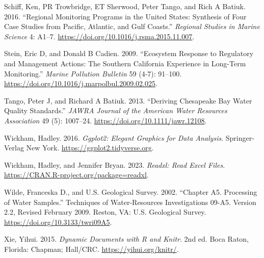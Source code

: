\begin{CSLReferences}{1}{0}
\leavevmode{}%
Schiff, Ken, PR Trowbridge, ET Sherwood, Peter Tango, and Rich A Batiuk. 2016. {``Regional Monitoring Programs in the United States: Synthesis of Four Case Studies from Pacific, Atlantic, and Gulf Coasts.''} \emph{Regional Studies in Marine Science} 4: A1--7. \url{https://doi.org/10.1016/j.rsma.2015.11.007}.

\leavevmode{}%
Stein, Eric D, and Donald B Cadien. 2009. {``Ecosystem Response to Regulatory and Management Actions: The Southern California Experience in Long-Term Monitoring.''} \emph{Marine Pollution Bulletin} 59 (4-7): 91--100. \url{https://doi.org/10.1016/j.marpolbul.2009.02.025}.

\leavevmode{}%
Tango, Peter J, and Richard A Batiuk. 2013. {``Deriving {C}hesapeake {B}ay Water Quality Standards.''} \emph{JAWRA Journal of the American Water Resources Association} 49 (5): 1007--24. \url{https://doi.org/10.1111/jawr.12108}.

\leavevmode{}%
Wickham, Hadley. 2016. \emph{Ggplot2: Elegant Graphics for Data Analysis}. Springer-Verlag New York. \url{https://ggplot2.tidyverse.org}.

\leavevmode{}%
Wickham, Hadley, and Jennifer Bryan. 2023. \emph{Readxl: Read Excel Files}. \url{https://CRAN.R-project.org/package=readxl}.

\leavevmode{}%
Wilde, Franceska D., and U.S. Geological Survey. 2002. {``Chapter A5. Processing of Water Samples.''} Techniques of Water-Resources Investigations 09-A5. Version 2.2, Revised February 2009. Reston, VA: U.S. Geological Survey. \url{https://doi.org/10.3133/twri09A5}.

\leavevmode{}%
Xie, Yihui. 2015. \emph{Dynamic Documents with {R} and Knitr}. 2nd ed. Boca Raton, Florida: Chapman; Hall/CRC. \url{https://yihui.org/knitr/}.

\end{CSLReferences}



\address{%
Marcus W. Beck\\
Tampa Bay Estuary Program\\%
263 13th Ave S\\ St.~Petersburg, Florida, USA 33701\\
%
\url{https://tbep.org}\\%
\textit{ORCiD: \href{https://orcid.org/0000-0002-4996-0059}{0000-0002-4996-0059}}\\%
\href{mailto:mbeck@tbep.org}{\nolinkurl{mbeck@tbep.org}}%
}

